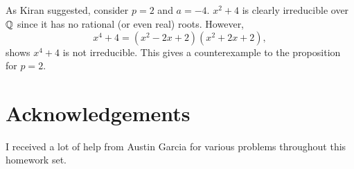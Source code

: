 \documentclass[12pt]{article}
\begin{document}
\setcounter{subsection}{2}
\subsection{} 
As Kiran suggested, consider $p = 2$ and $a = -4$. 
$x^2 + 4$ is clearly irreducible over $\mathbb{Q}$ since it has no rational (or even real) roots. 
However, 
$$x^4 + 4 = (x^2 - 2x + 2)(x^2 + 2x + 2),$$
shows $x^4 + 4$ is not irreducible. 
This gives a counterexample to the proposition for $p = 2$. 

\section*{Acknowledgements} 
I received a lot of help from Austin Garcia for various problems throughout this homework set. 
\end{document}
